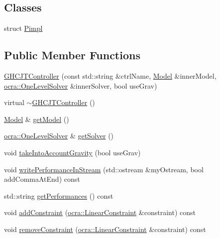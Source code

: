 \subsection*{Classes}
\begin{DoxyCompactItemize}
\item 
struct \hyperlink{structgocra_1_1GHCJTController_1_1Pimpl}{Pimpl}
\end{DoxyCompactItemize}
\subsection*{Public Member Functions}
\begin{DoxyCompactItemize}
\item 
\hyperlink{classgocra_1_1GHCJTController_a0a9898a818ddf6e52da7d63616bd73f6}{G\+H\+C\+J\+T\+Controller} (const std\+::string \&ctrl\+Name, \hyperlink{classocra_1_1Model}{Model} \&inner\+Model, \hyperlink{classocra_1_1OneLevelSolver}{ocra\+::\+One\+Level\+Solver} \&inner\+Solver, bool use\+Grav)
\item 
virtual \hyperlink{classgocra_1_1GHCJTController_ab20678c55e42d6f844b11e044f258e4b}{$\sim$\+G\+H\+C\+J\+T\+Controller} ()
\item 
\hyperlink{classocra_1_1Model}{Model} \& \hyperlink{classgocra_1_1GHCJTController_ac687ebab107bcd79828564b0adad2e10}{get\+Model} ()
\item 
\hyperlink{classocra_1_1OneLevelSolver}{ocra\+::\+One\+Level\+Solver} \& \hyperlink{classgocra_1_1GHCJTController_a25b8ce2edaa3fccc38dfa81900353856}{get\+Solver} ()
\item 
void \hyperlink{classgocra_1_1GHCJTController_a755394cc7a6c038f517583faa47e7f62}{take\+Into\+Account\+Gravity} (bool use\+Grav)
\item 
void \hyperlink{classgocra_1_1GHCJTController_a13941231bbf71bd58d9767b74f6fd61c}{write\+Performance\+In\+Stream} (std\+::ostream \&my\+Ostream, bool add\+Comma\+At\+End) const 
\item 
std\+::string \hyperlink{classgocra_1_1GHCJTController_ab34f6dc195063611030b67545f928b8b}{get\+Performances} () const 
\item 
void \hyperlink{classgocra_1_1GHCJTController_a43691156831a3479f5c2baecb126de4a}{add\+Constraint} (\hyperlink{namespaceocra_ae8b87cf4099be3efc3b410019ad2046e}{ocra\+::\+Linear\+Constraint} \&constraint) const 
\item 
void \hyperlink{classgocra_1_1GHCJTController_a3b3ac1167dc371393e0ee6f119457aa3}{remove\+Constraint} (\hyperlink{namespaceocra_ae8b87cf4099be3efc3b410019ad2046e}{ocra\+::\+Linear\+Constraint} \&constraint) const 

\end{DoxyCompactItemize}
